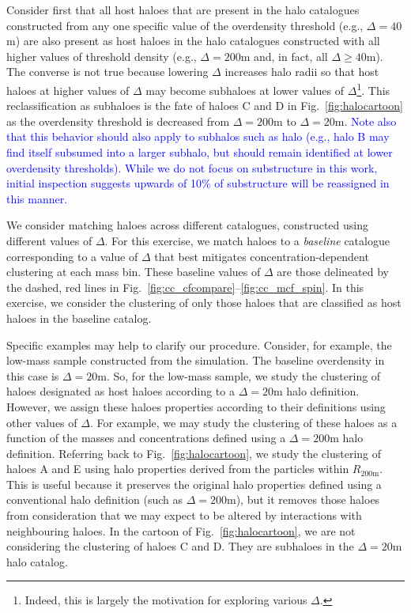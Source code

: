 \documentclass[usenatbib,fleqn]{mnras}
\begin{document}
Consider first that all host haloes that are present in the halo catalogues constructed from any one specific value of the overdensity threshold (e.g., $\Delta=40$m) are also present as host haloes in the halo catalogues constructed with all higher values of threshold density (e.g., $\Delta=200$m and, in fact, all $\Delta \ge 40$m). The converse is not true because lowering $\Delta$ increases halo radii so that host haloes at higher values of $\Delta$ may become subhaloes at lower values of $\Delta$\footnote{Indeed, this is largely the motivation for exploring various $\Delta$.}. This reclassification as subhaloes is the fate of haloes C and D in Fig.~\ref{fig:halocartoon} as the overdensity threshold is decreased from $\Delta=200$m to $\Delta=20$m. \textcolor{blue}{Note also that this behavior should also apply to subhalos such as halo (e.g., halo B may find itself subsumed into a larger subhalo, but should remain identified at lower overdensity thresholds). While we do not focus on substructure in this work, initial inspection suggests upwards of 10\% of substructure will be reassigned in this manner.}

We consider matching haloes across different catalogues, constructed using different values of $\Delta$. For this exercise, we match haloes to a {\em baseline} catalogue corresponding to a value of $\Delta$ that best mitigates concentration-dependent clustering at each mass bin. These baseline values of $\Delta$ are those delineated by the dashed, red lines in Fig.~\ref{fig:cc_cfcompare}--\ref{fig:cc_mcf_spin}. In this exercise, we consider the clustering of only those haloes that are classified as host haloes in the baseline catalog. 

Specific examples may help to clarify our procedure. Consider, for example, the low-mass sample constructed from the \simA{} simulation. The baseline overdensity in this case is $\Delta=20$m. So, for the low-mass sample, we study the clustering of haloes designated as host haloes according to a $\Delta=20$m halo definition. However, we assign these haloes properties according to their definitions using other values of $\Delta$. For example, we may study the clustering of these haloes as a function of the masses and concentrations defined using a $\Delta=200$m halo definition. Referring back to Fig.~\ref{fig:halocartoon}, we study the clustering of haloes A and E using halo properties derived from the particles within $R_{200{\mathrm{m}}}$. This is useful because it preserves the original halo properties defined using a conventional halo definition (such as $\Delta=200$m), but it removes those haloes from consideration that we may expect to be altered by interactions with neighbouring haloes. In the cartoon of Fig.~\ref{fig:halocartoon}, we are not considering the clustering of haloes C and D. They are subhaloes in the $\Delta=20$m halo catalog. 
\end{document}
